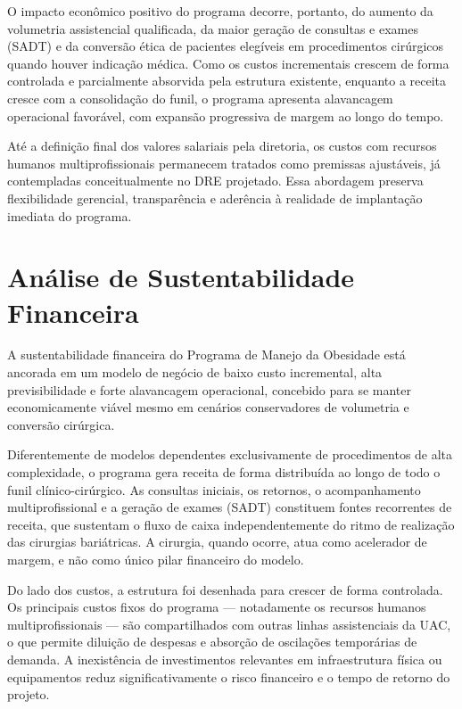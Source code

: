 \documentclass[12pt]{article}
\begin{document}
O impacto econômico positivo do programa decorre, portanto, do aumento da volumetria assistencial qualificada, da maior geração de consultas e exames (SADT) e da conversão ética de pacientes elegíveis em procedimentos cirúrgicos quando houver indicação médica. Como os custos incrementais crescem de forma controlada e parcialmente absorvida pela estrutura existente, enquanto a receita cresce com a consolidação do funil, o programa apresenta alavancagem operacional favorável, com expansão progressiva de margem ao longo do tempo.

Até a definição final dos valores salariais pela diretoria, os custos com recursos humanos multiprofissionais permanecem tratados como premissas ajustáveis, já contempladas conceitualmente no DRE projetado. Essa abordagem preserva flexibilidade gerencial, transparência e aderência à realidade de implantação imediata do programa.

\FGVNewPage

\section{Análise de Sustentabilidade Financeira}
\label{sec:org645e136}
A sustentabilidade financeira do Programa de Manejo da Obesidade está ancorada em um modelo de negócio de baixo custo incremental, alta previsibilidade e forte alavancagem operacional, concebido para se manter economicamente viável mesmo em cenários conservadores de volumetria e conversão cirúrgica.

Diferentemente de modelos dependentes exclusivamente de procedimentos de alta complexidade, o programa gera receita de forma distribuída ao longo de todo o funil clínico-cirúrgico. As consultas iniciais, os retornos, o acompanhamento multiprofissional e a geração de exames (SADT) constituem fontes recorrentes de receita, que sustentam o fluxo de caixa independentemente do ritmo de realização das cirurgias bariátricas. A cirurgia, quando ocorre, atua como acelerador de margem, e não como único pilar financeiro do modelo.

Do lado dos custos, a estrutura foi desenhada para crescer de forma controlada. Os principais custos fixos do programa — notadamente os recursos humanos multiprofissionais — são compartilhados com outras linhas assistenciais da UAC, o que permite diluição de despesas e absorção de oscilações temporárias de demanda. A inexistência de investimentos relevantes em infraestrutura física ou equipamentos reduz significativamente o risco financeiro e o tempo de retorno do projeto.
\end{document}
